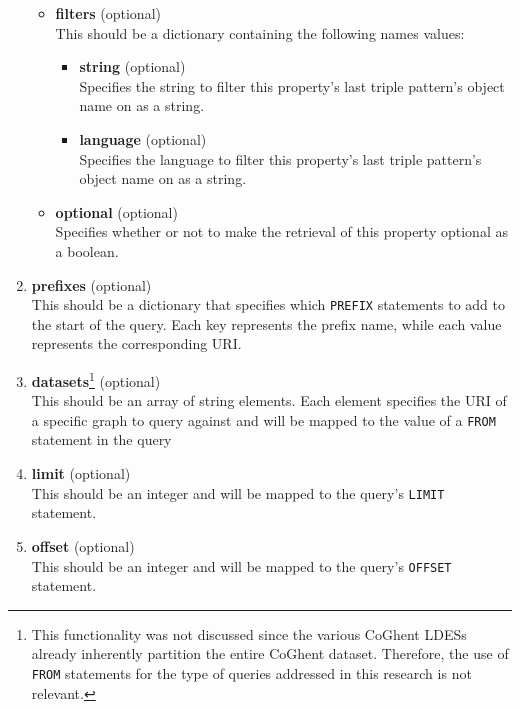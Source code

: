 \begin{enumerate}
\begin{itemize}
\begin{itemize}
            \end{itemize}
        
        \item \textbf{filters} (optional)\\
        This should be a dictionary containing the following names values:
        \begin{itemize}
            \item \textbf{string} (optional)\\
            Specifies the string to filter this property's last triple pattern's object name on as a string.

            \item \textbf{language} (optional)\\
            Specifies the language to filter this property's last triple pattern's object name on as a string.
            
        \end{itemize}

        \item \textbf{optional} (optional)\\
        Specifies whether or not to make the retrieval of this property optional as a boolean.

    \end{itemize}

    \item \textbf{prefixes} (optional)\\
    This should be a dictionary that specifies which \texttt{PREFIX} statements to add to the start of the query. Each key represents the prefix name, while each value represents the corresponding URI.

    \item \textbf{datasets}\footnote{This functionality was not discussed since the various CoGhent LDESs already inherently partition the entire CoGhent dataset. Therefore, the use of \texttt{FROM} statements for the type of queries addressed in this research is not relevant.} (optional)\\
    This should be an array of string elements. Each element specifies the URI of a specific graph to query against and will be mapped to the value of a \texttt{FROM} statement in the query

    \item \textbf{limit} (optional)\\
    This should be an integer and will be mapped to the query's \texttt{LIMIT} statement.

    \item \textbf{offset} (optional)\\
    This should be an integer and will be mapped to the query's \texttt{OFFSET} statement.

\end{enumerate}

